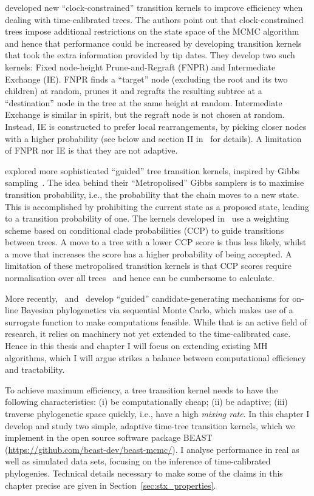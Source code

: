 \cite{Hoehna2008} developed new ``clock-constrained'' transition kernels to improve efficiency when dealing with time-calibrated trees. 
The authors point out that clock-constrained trees impose additional restrictions on the state space of the MCMC algorithm and hence that performance could be increased by developing transition kernels that took the extra information provided by tip dates.
They develop two such kernels: Fixed node-height Prune-and-Regraft (FNPR) and Intermediate Exchange (IE).
FNPR finds a ``target'' node (excluding the root and its two children) at random, prunes it and regrafts the resulting subtree at a ``destination'' node in the tree at the same height at random.
Intermediate Exchange is similar in spirit, but the regraft node  is not chosen at random. 
Instead, IE is constructed to prefer local rearrangements, by picking closer nodes with a higher probability (see below and section II in~\cite{Hoehna2008} for details).
A limitation of FNPR nor IE is that they are not adaptive.

\cite{Hoehna2012} explored more sophisticated ``guided'' tree transition kernels, inspired by Gibbs sampling~\citep{Geman1984}.
The idea behind their ``Metropolised'' Gibbs samplers is to maximise transition probability, i.e., the probability that the chain moves to a new state.
This is accomplished by prohibiting the current state as a proposed state, leading to a transition probability of one.
The kernels developed in~\cite{Hoehna2012} use a weighting scheme based on conditional clade probabilities (CCP) to guide transitions between trees.
A move to a tree with a lower CCP score is thus less likely, whilst a move that increases the score has a higher probability of being accepted.
A limitation of these metropolised transition kernels is that CCP scores require normalisation over all trees~\citep{Larget2013} and hence can be cumbersome to calculate.

More recently,~\cite{Dinh2016} and~\cite{Fourment2017} develop ``guided'' candidate-generating mechanisms for on-line Bayesian phylogenetics via sequential Monte Carlo, which makes use of a surrogate function to make computations feasible.
While that is an active field of research, it relies on machinery not yet extended to the time-calibrated case.
Hence in this thesis and chapter I will focus on extending existing MH algorithms, which I will argue strikes a balance between computational efficiency and tractability.

To achieve maximum efficiency, a tree transition kernel needs to have the following characteristics: (i) be computationally cheap; (ii) be adaptive; (iii) traverse phylogenetic space quickly, i.e., have a high \textit{mixing rate}.
In this chapter I develop and study two simple, adaptive time-tree transition kernels, which we implement in the open source software package BEAST (\url{https://github.com/beast-dev/beast-mcmc/}).
I analyse performance in real as well as simulated data sets, focusing on the inference of time-calibrated phylogenies.
Technical details necessary to make some of the claims in this chapter precise are given in Section~\ref{sec:stx_properties}. %

